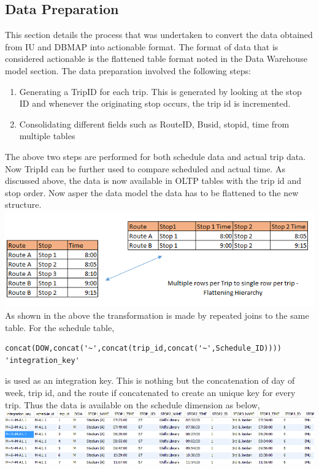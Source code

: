 \documentclass[12pt]{article}\usepackage[]{graphicx}\usepackage[]{color}
\begin{document}
\subsection{Data Preparation}
This section details the process that was undertaken to convert the data obtained from IU and DBMAP into actionable format. The format of data that is considered actionable is the flattened table format noted in the Data Warehouse model section.
The data preparation involved the following steps:
\begin{enumerate}
\item Generating a TripID for each trip. This is generated by looking at the stop ID and whenever the originating stop occurs, the trip id is incremented.
\item Consolidating different fields such as RouteID, Busid, stopid, time from multiple tables
\end{enumerate}
The above two steps are performed for both schedule data and actual trip data. Now TripId can be further used to compare scheduled and actual time.
As discussed above, the data is now available in OLTP tables with the trip id and stop order. Now asper the data model the data has to be flattened to the new structure.\\
\includegraphics[scale=0.6]{resources/hierarchy}\\[1cm] 
As shown in the above the transformation is made by repeated joins to the same table. For the schedule table,
\begin{verbatim}
concat(DOW,concat('~',concat(trip_id,concat('~',Schedule_ID)))) 'integration_key' 
\end{verbatim}
is used as an integration key. This is nothing but the concatenation of day of week, trip id, and the route if concatenated to create an unique key for every trip. Thus the data is available on the schedule dimension as below,\\
\includegraphics[scale=0.6]{resources/wt1}\\[1cm] 
\end{document}
